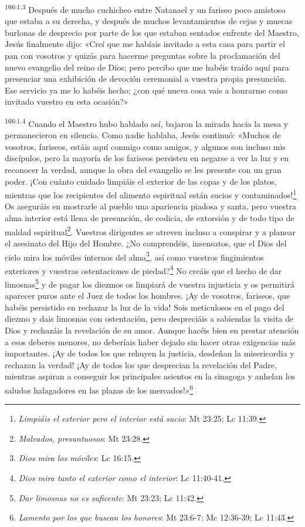 \par
\textsuperscript{166:1.3} Después de mucho cuchicheo entre Natanael y un fariseo poco amistoso que estaba a su derecha, y después de muchos levantamientos de cejas y muecas burlonas de desprecio por parte de los que estaban sentados enfrente del Maestro, Jesús finalmente dijo: «Creí que me habíais invitado a esta casa para partir el pan con vosotros y quizás para hacerme preguntas sobre la proclamación del nuevo evangelio del reino de Dios; pero percibo que me habéis traído aquí para presenciar una exhibición de devoción ceremonial a vuestra propia presunción. Ese servicio ya me lo habéis hecho; ¿con qué nueva cosa vais a honrarme como invitado vuestro en esta ocasión?»

\par
\textsuperscript{166:1.4} Cuando el Maestro hubo hablado así, bajaron la mirada hacia la mesa y permanecieron en silencio. Como nadie hablaba, Jesús continuó: «Muchos de vosotros, fariseos, estáis aquí conmigo como amigos, y algunos son incluso mis discípulos, pero la mayoría de los fariseos persisten en negarse a ver la luz y en reconocer la verdad, aunque la obra del evangelio se les presente con un gran poder. ¡Con cuánto cuidado limpiáis el exterior de las copas y de los platos, mientras que los recipientes del alimento espiritual están sucios y contaminados!\footnote{\textit{Limpiáis el exterior pero el interior está sucio}: Mt 23:25; Lc 11:39.} Os aseguráis en mostrarle al pueblo una apariencia piadosa y santa, pero vuestra alma interior está llena de presunción, de codicia, de extorsión y de todo tipo de maldad espiritual\footnote{\textit{Malvados, presuntuosos}: Mt 23:28.}. Vuestros dirigentes se atreven incluso a conspirar y a planear el asesinato del Hijo del Hombre. ¿No comprendéis, insensatos, que el Dios del cielo mira los móviles internos del alma\footnote{\textit{Dios mira los móviles}: Lc 16:15.}, así como vuestros fingimientos exteriores y vuestras ostentaciones de piedad?\footnote{\textit{Dios mira tanto el exterior como el interior}: Lc 11:40-41.} No creáis que el hecho de dar limosnas\footnote{\textit{Dar limosnas no es suficente}: Mt 23:23; Lc 11:42.} y de pagar los diezmos os limpiará de vuestra injusticia y os permitirá aparecer puros ante el Juez de todos los hombres. ¡Ay de vosotros, fariseos, que habéis persistido en rechazar la luz de la vida! Sois meticulosos en el pago del diezmo y dais limosnas con ostentación, pero despreciáis a sabiendas la visita de Dios y rechazáis la revelación de su amor. Aunque hacéis bien en prestar atención a esos deberes menores, no deberíais haber dejado sin hacer otras exigencias más importantes. ¡Ay de todos los que rehuyen la justicia, desdeñan la misericordia y rechazan la verdad! ¡Ay de todos los que desprecian la revelación del Padre, mientras aspiran a conseguir los principales asientos en la sinagoga y anhelan los saludos halagadores en las plazas de los mercados!»\footnote{\textit{Lamento por los que buscan los honores}: Mt 23:6-7; Mc 12:36-39; Lc 11:43.}

